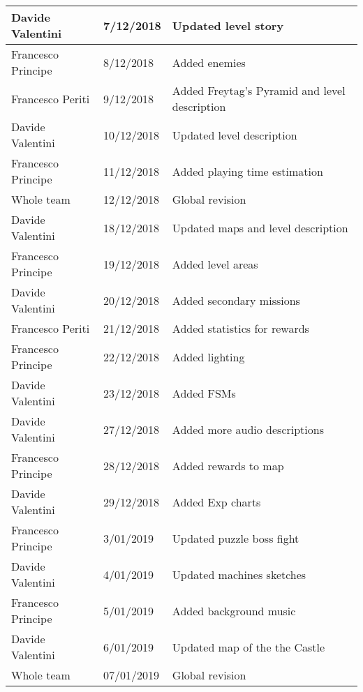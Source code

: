 \begin{longtable}[H]{|l|l|l|}
Davide Valentini & 7/12/2018 & Updated level story \\ \hline
Francesco Principe & 8/12/2018 & Added enemies \\ \hline
Francesco Periti & 9/12/2018 & Added Freytag's Pyramid and level description \\ \hline
Davide Valentini & 10/12/2018 & Updated level description \\ \hline
Francesco Principe & 11/12/2018 & Added playing time estimation \\ \hline
Whole team & 12/12/2018 & Global revision \\ \hline

Davide Valentini & 18/12/2018 & Updated maps and level description \\ \hline
Francesco Principe & 19/12/2018 & Added level areas \\ \hline
Davide Valentini & 20/12/2018 & Added secondary missions \\ \hline
Francesco Periti & 21/12/2018 & Added statistics for rewards \\ \hline
Francesco Principe & 22/12/2018 & Added lighting \\ \hline
Davide Valentini & 23/12/2018 & Added FSMs \\ \hline
Davide Valentini & 27/12/2018 & Added more audio descriptions \\ \hline
Francesco Principe & 28/12/2018 & Added rewards to map \\ \hline
Davide Valentini & 29/12/2018 & Added Exp charts \\ \hline
Francesco Principe & 3/01/2019 & Updated puzzle boss fight \\ \hline
Davide Valentini & 4/01/2019 & Updated machines sketches \\ \hline
Francesco Principe & 5/01/2019 & Added background music \\ \hline
Davide Valentini & 6/01/2019 & Updated map of the the Castle \\ \hline
Whole team & 07/01/2019 & Global revision \\ \hline
\end{longtable}
